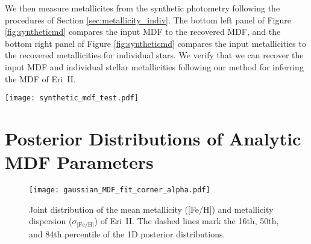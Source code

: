 \documentclass[twocolumn]{aastex63}
\begin{document}
\par We then measure metallicites from the synthetic photometry following the procedures of Section \ref{sec:metallicity_indiv}. The bottom left panel of Figure \ref{fig:syntheticmd} compares the input MDF to the recovered MDF, and the bottom right panel of Figure \ref{fig:syntheticmd} compares the input metallicities to the recovered metallicities for individual stars. We verify that we can recover the input MDF and individual stellar metallicities following our method for inferring the MDF of Eri~II.




\begin{figure*}
\texttt{[image: synthetic\_mdf\_test.pdf]}
\caption{\textbf{(top left)} The 60 model photometry points that we draw from isochrone models, with metallicity counts set by a Gaussian MDF with a mean and spread consistent with what we measure for Eri~II. Points are color-coded by their known metallicities. We also apply extinction to the tracks and the photometry in this plot, but it is negligible (on order of $\sim$0.01~mag). \textbf{(top right)} Synthetic photometry after appying bias and uncertainty from the ASTs (described in Section \ref{sec:data} to the model photometry. As in the previous panel, points are color-coded by their known metallicities. \textbf{(bottom left)} Comparing the input MDF to the MDF recovered after measuring individual stellar metallicities of the synthetic photometry, following the procedures in Section \ref{sec:metallicity_indiv}. \textbf{(bottom right)} Comparing the input metallicity to the recovered metallicity measurements for individual stars. Points are color-coded by their synthetic F395N S/N, as determined from the ASTs. The dash-dotted line is a 1-1 relation.}
\label{fig:syntheticmd}
\end{figure*}

\section{Posterior Distributions of Analytic MDF Parameters}

\begin{figure}
    \centering
    \texttt{[image: gaussian\_MDF\_fit\_corner\_alpha.pdf]}
    \caption{Joint distribution of the mean metallicity ([Fe/H]) and metallicity dispersion ($\sigma_{\mbox{[Fe/H]}}$) of Eri~II. The dashed lines mark the 16th, 50th, and 84th percentile of the 1D posterior distributions.}
    \label{fig:gaussian_corner}
\end{figure}
\end{document}

